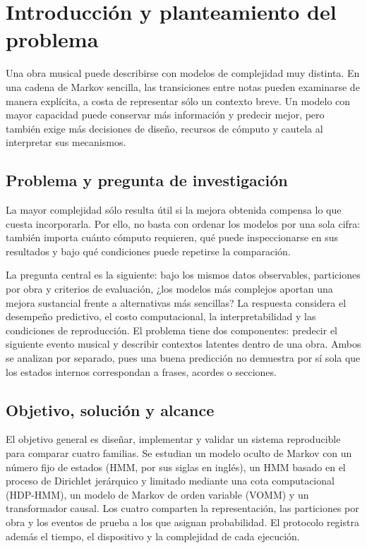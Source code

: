 \chapter{Introducción y planteamiento del problema}
\label{chap:planteamiento}

Una obra musical puede describirse con modelos de complejidad muy distinta. En una cadena de Markov sencilla, las transiciones entre notas pueden examinarse de manera explícita, a costa de representar sólo un contexto breve. Un modelo con mayor capacidad puede conservar más información y predecir mejor, pero también exige más decisiones de diseño, recursos de cómputo y cautela al interpretar sus mecanismos.

\section{Problema y pregunta de investigación}

La mayor complejidad sólo resulta útil si la mejora obtenida compensa lo que cuesta incorporarla. Por ello, no basta con ordenar los modelos por una sola cifra: también importa cuánto cómputo requieren, qué puede inspeccionarse en sus resultados y bajo qué condiciones puede repetirse la comparación.

La pregunta central es la siguiente: bajo los mismos datos observables, particiones por obra y criterios de evaluación, ¿los modelos más complejos aportan una mejora sustancial frente a alternativas más sencillas? La respuesta considera el desempeño predictivo, el costo computacional, la interpretabilidad y las condiciones de reproducción. El problema tiene dos componentes: predecir el siguiente evento musical y describir contextos latentes dentro de una obra. Ambos se analizan por separado, pues una buena predicción no demuestra por sí sola que los estados internos correspondan a frases, acordes o secciones.

\section{Objetivo, solución y alcance}

El objetivo general es diseñar, implementar y validar un sistema reproducible para comparar cuatro familias. Se estudian un modelo oculto de Markov con un número fijo de estados (HMM, por sus siglas en inglés), un HMM basado en el proceso de Dirichlet jerárquico y limitado mediante una cota computacional (HDP-HMM), un modelo de Markov de orden variable (VOMM) y un transformador causal. Los cuatro comparten la representación, las particiones por obra y los eventos de prueba a los que asignan probabilidad. El protocolo registra además el tiempo, el dispositivo y la complejidad de cada ejecución.

